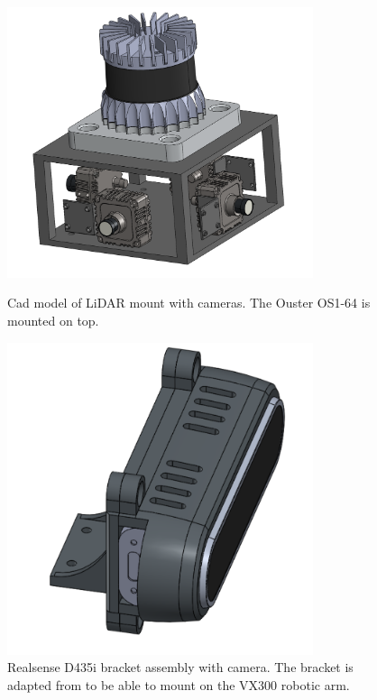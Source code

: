 \begin{figure}[htp]
  \centering
  \begin{minipage}[b]{0.49\textwidth}
    \centering
    \includegraphics[width = 0.8\textwidth]{Figures/lidar_mount.png}
    \caption{Cad model of LiDAR mount with cameras. The Ouster OS1-64 is mounted on top.}
     \label{fig:lidar_mount}
  \end{minipage}
  \hfill
  \begin{minipage}[b]{0.49\textwidth}
    \centering
    \includegraphics[width = 0.8\textwidth]{Figures/realsense_assembly.pdf}
    \caption{Realsense D435i bracket assembly with camera. The bracket is adapted from \cite{d435_sleeve} to be able to mount on the VX300 robotic arm.}
    \label{fig:realsense_assembly}
  \end{minipage}
\end{figure}

